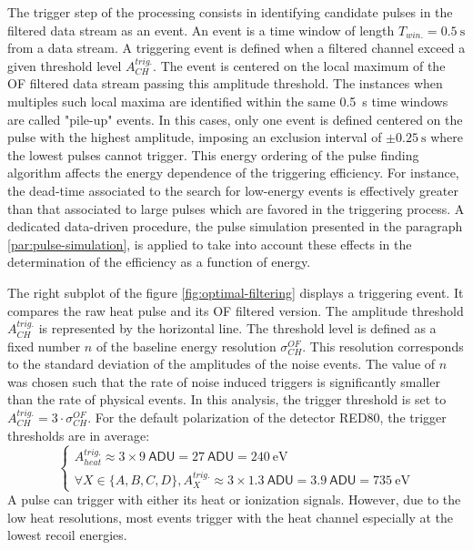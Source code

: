 The trigger step of the processing consists in identifying candidate pulses in the filtered data stream as an event. An event is a time window of length $T_{win.} = \SI{0.5}{\s}$ from a data stream. A triggering event is defined when a filtered channel exceed a given threshold level $A_{CH}^{trig.}$. The event is centered on the local maximum of the OF filtered data stream passing this amplitude threshold. The instances when multiples such local maxima are identified within the same \SI{0.5}{\s} time windows are called "pile-up" events. In this cases, only one event is defined centered on the pulse with the highest amplitude, imposing an exclusion interval of $\pm\SI{0.25}{\s}$ where the lowest pulses cannot trigger.
This energy ordering of the pulse finding algorithm affects the energy dependence of the triggering efficiency. For instance, the dead-time associated to the search
for low-energy events is effectively greater than that associated to large pulses which are favored in the triggering process. A dedicated data-driven procedure, the pulse simulation presented in the paragraph \ref{par:pulse-simulation}, is applied to take into account these effects in the determination of the efficiency as a function of energy. 

The right subplot of the figure \ref{fig:optimal-filtering} displays a triggering event. It compares the raw heat pulse and its OF filtered version. The amplitude threshold $A_{CH}^{trig.}$ is represented by the horizontal line. The threshold level is defined as a fixed number $n$ of the baseline energy resolution $\sigma_{CH}^{OF}$. This resolution corresponds to the standard deviation of the amplitudes of the noise events.
The value of $n$ was chosen such that the rate of noise induced triggers is significantly smaller than the rate of physical events.
In this analysis, the trigger threshold is set to $A_{CH}^{trig.} = 3 \cdot \sigma_{CH}^{OF}$. For the default polarization of the detector RED80, the trigger thresholds are in average:
\begin{equation}
\begin{cases}
A_{heat}^{trig.} \approx 3 \times \SI{9}{\textsf{ADU}} = \SI{27}{\textsf{ADU}} = \SI{240}{\eV} \\
\forall X \in \{A,B,C,D \}, 
A_{X}^{trig.} \approx 3 \times \SI{1.3}{\textsf{ADU}} = \SI{3.9}{\textsf{ADU}} = \SI{735}{\eV}
\end{cases}
\end{equation}
A pulse can trigger with either its heat or ionization signals. However, due to the low heat resolutions, most events trigger with the heat channel especially at the lowest recoil energies.



